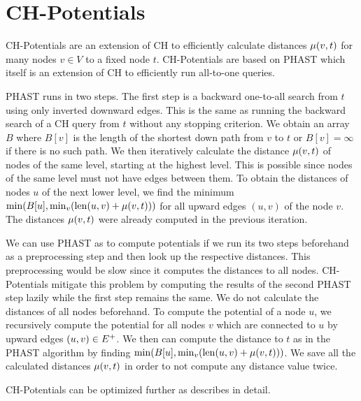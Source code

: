 \section{CH-Potentials\label{sec:ch_pot}}
CH-Potentials \cite{strasser:2021} are an extension of CH to efficiently calculate distances $\mu(v,t)$ for many nodes $v \in V$ to a fixed node $t$. CH-Potentials are based on PHAST \cite{delling:2011} which itself is an extension of CH to efficiently run all-to-one queries.

PHAST runs in two steps. The first step is a backward one-to-all search from $t$ using only inverted downward edges. This is the same as running the backward search of a CH query from $t$ without any stopping criterion. We obtain an array $B$ where $B[v]$ is the length of the shortest down path from $v$ to $t$ or $B[v]=\infty$ if there is no such path. We then iteratively calculate the distance $\mu(v,t)$ of nodes of the same level, starting at the highest level. This is possible since nodes of the same level must not have edges between them. To obtain the distances of nodes $u$ of the next lower level, we find the minimum $\min(B[u], \min_v(\operatorname{len}(u,v) + \mu(v,t)))$ for all upward edges $(u,v)$ of the node $v$. The distances $\mu(v,t)$ were already computed in the previous iteration.

We can use PHAST as to compute potentials if we run its two steps beforehand as a preprocessing step and then look up the respective distances. This preprocessing would be slow since it computes the distances to all nodes. CH-Potentials mitigate this problem by computing the results of the second PHAST step lazily while the first step remains the same. We do not calculate the distances of all nodes beforehand. To compute the potential of a node $u$, we recursively compute the potential for all nodes $v$ which are connected to $u$ by upward edges $(u,v) \in E^+$. We then can compute the distance to $t$ as in the PHAST algorithm by finding $\min(B[u], \min_v(\operatorname{len}(u,v) + \mu(v,t)))$. We save all the calculated distances $\mu(v,t)$ in order to not compute any distance value twice.

CH-Potentials can be optimized further as \cite{strasser:2021} describes in detail.